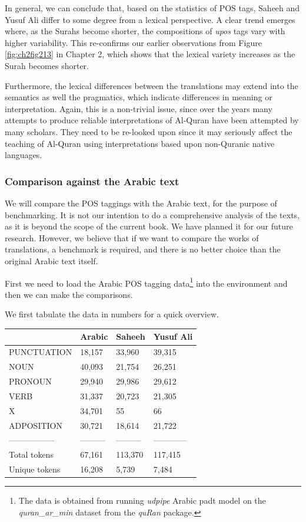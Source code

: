 \documentclass[
]{article}
\begin{document}
In general, we can conclude that, based on the statistics of POS tags, Saheeh and Yusuf Ali differ to some degree from a lexical perspective. A clear trend emerges where, as the Surahs become shorter, the compositions of \emph{upos} tags vary with higher variability. This re-confirms our earlier observations from Figure \ref{fig:ch2fig213} in Chapter 2, which shows that the lexical variety increases as the Surah becomes shorter.

Furthermore, the lexical differences between the translations may extend into the semantics as well the pragmatics, which indicate differences in meaning or interpretation. Again, this is a non-trivial issue, since over the years many attempts to produce reliable interpretations of Al-Quran have been attempted by many scholars. They need to be re-looked upon since it may seriously affect the teaching of Al-Quran using interpretations based upon non-Quranic native languages.

\hypertarget{comparison-against-the-arabic-text}{%
\subsubsection{Comparison against the Arabic text}\label{comparison-against-the-arabic-text}}

We will compare the POS taggings with the Arabic text, for the purpose of benchmarking. It is not our intention to do a comprehensive analysis of the texts, as it is beyond the scope of the current book. We have planned it for our future research. However, we believe that if we want to compare the works of translations, a benchmark is required, and there is no better choice than the original Arabic text itself.

First we need to load the Arabic POS tagging data\footnote{The data is obtained from running \emph{udpipe} Arabic padt model on the \emph{quran\_ar\_min} dataset from the \emph{quRan} package.} into the environment and then we can make the comparisons.

We first tabulate the data in numbers for a quick overview.

\begin{longtable}[]{@{}llll@{}}
\toprule\noalign{}
& Arabic & Saheeh & Yusuf Ali \\
\midrule\noalign{}
\endhead
\bottomrule\noalign{}
\endlastfoot
PUNCTUATION & 18,157 & 33,960 & 39,315 \\
NOUN & 40,093 & 21,754 & 26,251 \\
PRONOUN & 29,940 & 29,986 & 29,612 \\
VERB & 31,337 & 20,723 & 21,305 \\
X & 34,701 & 55 & 66 \\
ADPOSITION & 30,721 & 18,614 & 21,722 \\
----------------- & --------- & --------- & ------------ \\
Total tokens & 67,161 & 113,370 & 117,415 \\
Unique tokens & 16,208 & 5,739 & 7,484 \\
\end{longtable}
\end{document}
